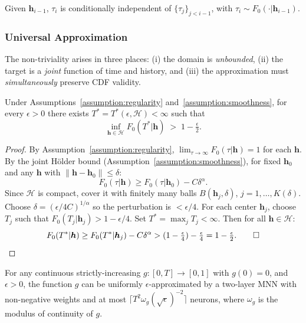 \begin{assumption}
\label{assumption:conditional_independence}
Given $\boldsymbol{h}_{i-1}$, $\tau_i$ is conditionally independent of
$\{\tau_j\}_{j < i-1}$, with $\tau_i \sim F_0(\cdot|\boldsymbol{h}_{i-1})$.
\end{assumption}

\subsubsection{Universal Approximation}

The non-triviality arises in three places: (i) the domain is \emph{unbounded},
(ii) the target is a \emph{joint} function of time and history, and (iii) the
approximation must \emph{simultaneously} preserve CDF validity.

\begin{lemma}
\label{lem:tail}
Under Assumptions~\ref{assumption:regularity} and~\ref{assumption:smoothness},
for every $\epsilon > 0$ there exists $T^* = T^*(\epsilon, \mathcal{H}) < \infty$
such that
\[
\inf_{\boldsymbol{h} \in \mathcal{H}} F_0(T^*|\boldsymbol{h}) \;>\; 1 - \tfrac{\epsilon}{2}.
\]
\end{lemma}

\begin{proof}
By Assumption~\ref{assumption:regularity}, $\lim_{\tau\to\infty} F_0(\tau|\boldsymbol{h}) = 1$
for each $\boldsymbol{h}$. By the joint Hölder bound
(Assumption~\ref{assumption:smoothness}), for fixed $\boldsymbol{h}_0$ and any
$\boldsymbol{h}$ with $\|\boldsymbol{h}-\boldsymbol{h}_0\| \leq \delta$:
\[
F_0(\tau|\boldsymbol{h}) \geq F_0(\tau|\boldsymbol{h}_0) - C\delta^\alpha.
\]
Since $\mathcal{H}$ is compact, cover it with finitely many balls
$B(\boldsymbol{h}_j, \delta)$, $j = 1,\ldots, K(\delta)$.
Choose $\delta = (\epsilon/4C)^{1/\alpha}$ so the perturbation is $< \epsilon/4$.
For each center $\boldsymbol{h}_j$, choose $T_j$ such that
$F_0(T_j|\boldsymbol{h}_j) > 1 - \epsilon/4$. Set $T^* = \max_j T_j < \infty$.
Then for all $\boldsymbol{h} \in \mathcal{H}$:
\[
F_0(T^*|\boldsymbol{h}) \geq F_0(T^*|\boldsymbol{h}_j) - C\delta^\alpha
> (1 - \tfrac{\epsilon}{4}) - \tfrac{\epsilon}{4} = 1 - \tfrac{\epsilon}{2}. \qed
\]
\end{proof}

\begin{lemma}
\label{lem:pwl}
For any continuous strictly-increasing $g: [0,T] \to [0,1]$ with $g(0) = 0$,
and $\epsilon > 0$, the function $g$ can be uniformly $\epsilon$-approximated
by a two-layer MNN with non-negative weights and at most
$\lceil T^2 \omega_g(\sqrt{\epsilon})^{-2} \rceil$ neurons, where $\omega_g$ is the
modulus of continuity of $g$.
\end{lemma}

